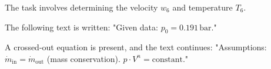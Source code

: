 The task involves determining the velocity \( w_6 \) and temperature \( T_6 \).  

The following text is written:  
"Given data:  
\( p_0 = 0.191 \, \text{bar} \)."  

A crossed-out equation is present, and the text continues:  
"Assumptions:  
\( \dot{m}_{\text{in}} = \dot{m}_{\text{out}} \) (mass conservation).  
\( p \cdot V^n = \text{constant} \)."